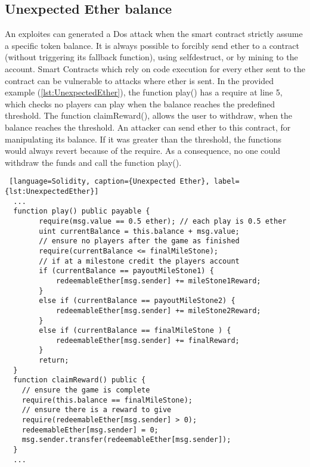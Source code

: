 \documentclass[a4paper,sigconf, language=french,
language=german, language=spanish, language=english]{acmart}
\begin{document}
\subsection{Unexpected Ether balance} An exploites can generated a Dos attack when the smart contract strictly assume a specific token balance. 
It is always possible to forcibly send ether to a contract (without triggering its fallback function), 
using selfdestruct, or by mining to the account. Smart Contracts which rely on code execution for every ether sent to the contract can be vulnerable to attacks where ether is sent.
In the provided example (\autoref{lst:UnexpectedEther}), the function play() has a require at line 5, which checks no players can play when the balance 
reaches the predefined threshold. The function claimReward(), allows the user to withdraw, when the balance reaches the threshold. 
An attacker can send ether to this contract, for manipulating its balance. If it was greater than the threshold, the functions would always 
revert because of the require. As a consequence, no one could withdraw the funds and call the function play().
\begin{lstlisting} [language=Solidity, caption={Unexpected Ether}, label={lst:UnexpectedEther}]
  ...
  function play() public payable {
        require(msg.value == 0.5 ether); // each play is 0.5 ether
        uint currentBalance = this.balance + msg.value;
        // ensure no players after the game as finished
        require(currentBalance <= finalMileStone);
        // if at a milestone credit the players account
        if (currentBalance == payoutMileStone1) {
            redeemableEther[msg.sender] += mileStone1Reward;
        }
        else if (currentBalance == payoutMileStone2) {
            redeemableEther[msg.sender] += mileStone2Reward;
        }
        else if (currentBalance == finalMileStone ) {
            redeemableEther[msg.sender] += finalReward;
        }
        return;
  }
  function claimReward() public {
    // ensure the game is complete
    require(this.balance == finalMileStone);
    // ensure there is a reward to give
    require(redeemableEther[msg.sender] > 0); 
    redeemableEther[msg.sender] = 0;
    msg.sender.transfer(redeemableEther[msg.sender]);
  }
  ...
\end{lstlisting}
\end{document}
